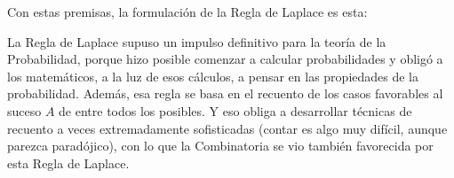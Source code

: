 Con estas premisas, la formulación de la Regla de Laplace es esta:
        \begin{center}
        \end{center}
%
%
%
%
%
%
La Regla de Laplace supuso un impulso definitivo para la teoría de la Probabilidad, porque hizo posible comenzar a calcular probabilidades y obligó a los matemáticos, a la luz de esos cálculos, a pensar en las propiedades de la probabilidad. Además, esa regla se basa en el recuento de los casos favorables al suceso $A$ de entre todos los posibles. Y eso obliga a desarrollar técnicas de recuento a veces extremadamente sofisticadas (contar es algo muy difícil, aunque parezca paradójico), con lo que la Combinatoria se vio también favorecida por esta Regla de Laplace.

